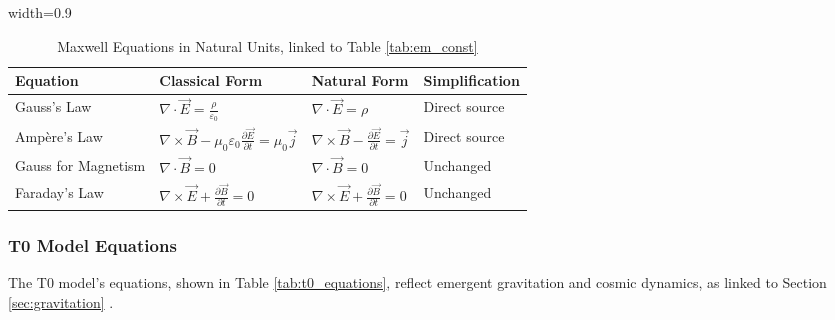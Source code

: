 \documentclass[12pt,a4paper]{article}
\newcommand{\tablescale}{0.9}
\begin{document}
	\begin{table}[htbp]
		\centering
		\begin{adjustbox}{width=\tablescale\textwidth}
			\begin{tabular}{llll}
				\toprule
				\textbf{Equation} & \textbf{Classical Form} & \textbf{Natural Form} & \textbf{Simplification} \\
				\midrule
				Gauss’s Law & \(\nabla \cdot \vec{E} = \frac{\rho}{\varepsilon_0}\) & \(\nabla \cdot \vec{E} = \rho\) & Direct source \\
				Ampère’s Law & \(\nabla \times \vec{B} - \mu_0 \varepsilon_0 \frac{\partial \vec{E}}{\partial t} = \mu_0 \vec{j}\) & \(\nabla \times \vec{B} - \frac{\partial \vec{E}}{\partial t} = \vec{j}\) & Direct source \\
				Gauss for Magnetism & \(\nabla \cdot \vec{B} = 0\) & \(\nabla \cdot \vec{B} = 0\) & Unchanged \\
				Faraday’s Law & \(\nabla \times \vec{E} + \frac{\partial \vec{B}}{\partial t} = 0\) & \(\nabla \times \vec{E} + \frac{\partial \vec{B}}{\partial t} = 0\) & Unchanged \\
				\bottomrule
			\end{tabular}
		\end{adjustbox}
		\caption{Maxwell Equations in Natural Units, linked to Table \ref{tab:em_const}}
		\label{tab:maxwell}
	\end{table}
	
	\subsubsection{T0 Model Equations}
	\label{subsec:t0_equations}
	
	The T0 model’s equations, shown in Table \ref{tab:t0_equations}, reflect emergent gravitation and cosmic dynamics, as linked to Section \ref{sec:gravitation} \cite{pascher_emergente_2025}.
	
\end{document}

